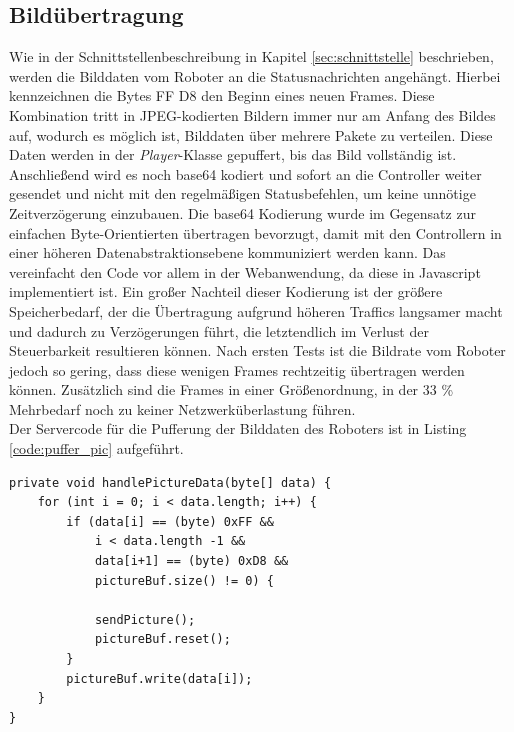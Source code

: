 \subsection{Bildübertragung}
Wie in der Schnittstellenbeschreibung in Kapitel \ref{sec:schnittstelle} beschrieben, werden die Bilddaten vom Roboter an die Statusnachrichten angehängt. Hierbei kennzeichnen die Bytes FF D8 den Beginn eines neuen Frames. Diese Kombination tritt in JPEG-kodierten Bildern immer nur am Anfang des Bildes auf, wodurch es möglich ist, Bilddaten über mehrere Pakete zu verteilen. Diese Daten werden in der \textit{Player}-Klasse gepuffert, bis das Bild vollständig ist. Anschließend wird es noch base64 kodiert und sofort an die Controller weiter gesendet und nicht mit den regelmäßigen Statusbefehlen, um keine unnötige Zeitverzögerung einzubauen. Die base64 Kodierung wurde im Gegensatz zur einfachen Byte-Orientierten übertragen bevorzugt, damit mit den Controllern in einer höheren Datenabstraktionsebene kommuniziert werden kann. Das vereinfacht den Code vor allem in der Webanwendung, da diese in Javascript implementiert ist. Ein großer Nachteil dieser Kodierung ist der größere Speicherbedarf, der die Übertragung aufgrund höheren Traffics langsamer macht und dadurch zu Verzögerungen führt, die letztendlich im Verlust der Steuerbarkeit resultieren können. Nach ersten Tests ist die Bildrate vom Roboter jedoch so gering, dass diese wenigen Frames rechtzeitig übertragen werden können. Zusätzlich sind die Frames in einer Größenordnung, in der 33 \% Mehrbedarf noch zu keiner Netzwerküberlastung führen.\\ Der Servercode für die Pufferung der Bilddaten des Roboters ist in Listing \ref{code:puffer_pic} aufgeführt.

\begin{lstlisting}[captionpos = b, caption=Logik für die Pufferung der Bilddaten, label = code:puffer_pic]
private void handlePictureData(byte[] data) {
	for (int i = 0; i < data.length; i++) {
		if (data[i] == (byte) 0xFF && 
			i < data.length -1 && 
			data[i+1] == (byte) 0xD8 && 
			pictureBuf.size() != 0) {
			
			sendPicture();
			pictureBuf.reset();
		}
		pictureBuf.write(data[i]);
	}
}
\end{lstlisting}




